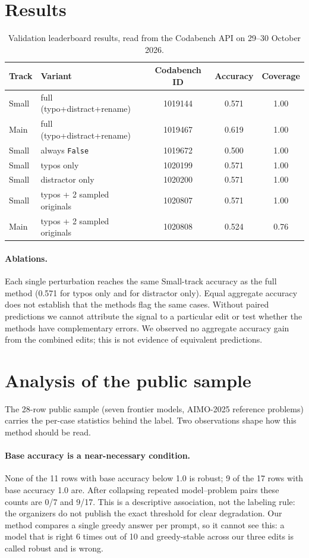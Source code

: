 \documentclass{article}
\begin{document}
\section{Results}
\begin{table}[h]
\centering
\begin{tabular}{llccc}
\toprule
Track & Variant & Codabench ID & Accuracy & Coverage \\
\midrule
Small & full (typo+distract+rename) & 1019144 & 0.571 & 1.00 \\
Main & full (typo+distract+rename) & 1019467 & 0.619 & 1.00 \\
Small & always \texttt{False} & 1019672 & 0.500 & 1.00 \\
Small & typos only & 1020199 & 0.571 & 1.00 \\
Small & distractor only & 1020200 & 0.571 & 1.00 \\
Small & typos + 2 sampled originals & 1020807 & 0.571 & 1.00 \\
Main & typos + 2 sampled originals & 1020808 & 0.524 & 0.76 \\
\bottomrule
\end{tabular}
\caption{Validation leaderboard results, read from the Codabench API on 29--30 October 2026.}
\end{table}

\paragraph{Ablations.} Each single perturbation reaches the same Small-track accuracy as the full method (0.571 for typos only and for distractor only). Equal aggregate accuracy does not establish that the methods flag the same cases. Without paired predictions we cannot attribute the signal to a particular edit or test whether the methods have complementary errors. We observed no aggregate accuracy gain from the combined edits; this is not evidence of equivalent predictions.

\section{Analysis of the public sample}
The 28-row public sample (seven frontier models, AIMO-2025 reference problems) carries the per-case statistics behind the label. Two observations shape how this method should be read.
\paragraph{Base accuracy is a near-necessary condition.} None of the 11 rows with base accuracy below 1.0 is robust; 9 of the 17 rows with base accuracy 1.0 are. After collapsing repeated model--problem pairs these counts are 0/7 and 9/17. This is a descriptive association, not the labeling rule: the organizers do not publish the exact threshold for clear degradation. Our method compares a single greedy answer per prompt, so it cannot see this: a model that is right 6 times out of 10 and greedy-stable across our three edits is called robust and is wrong.
\end{document}

